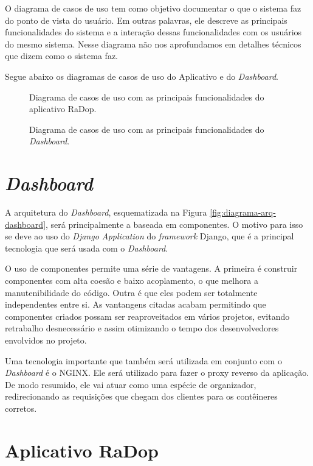 O diagrama de casos de uso tem como objetivo documentar o que o sistema faz do ponto de vista do usuário. Em outras palavras, ele descreve as principais funcionalidades do sistema e a interação dessas funcionalidades com os usuários do mesmo sistema. Nesse diagrama não nos aprofundamos em detalhes técnicos que dizem como o sistema faz.

Segue abaixo os diagramas de casos de uso do Aplicativo e do \textit{Dashboard}.

\begin{figure}[ht]
	\caption{\label{fig:casos_de_uso} Diagrama de casos de uso com as principais funcionalidades do aplicativo RaDop.}
\end{figure}\newpage

\begin{figure}[ht]
	\caption{\label{fig:diagrama-comm-soft} Diagrama de casos de uso com as principais funcionalidades do \textit{Dashboard}.}
\end{figure}

\section{\textit{Dashboard}}

A arquitetura do \textit{Dashboard}, esquematizada na Figura \ref{fig:diagrama-arq-dashboard}, será principalmente a baseada em componentes. O motivo para isso se deve ao uso do \textit{Django Application} do \textit{framework} Django, que é a principal tecnologia que será usada com o \textit{Dashboard}.

O uso de componentes permite uma série de vantagens. A primeira é construir componentes com alta coesão e baixo acoplamento, o que melhora a manutenibilidade do código. Outra é que eles podem ser totalmente independentes entre si. As vantangens citadas acabam permitindo que componentes criados possam ser reaproveitados em vários projetos, evitando retrabalho desnecessário e assim otimizando o tempo dos desenvolvedores envolvidos no projeto.

Uma tecnologia importante que também será utilizada em conjunto com o \textit{Dashboard} é o NGINX. Ele será utilizado para fazer o proxy reverso da aplicação. De modo resumido, ele vai atuar como uma espécie de organizador, redirecionando as requisições que chegam dos clientes para os contêineres corretos.

\section{Aplicativo RaDop}

